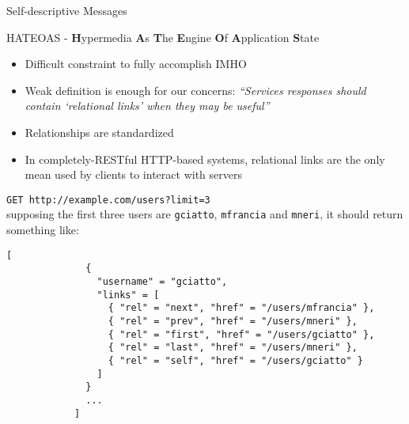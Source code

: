 \begin{frame}
\begin{block}{Self-descriptive Messages}
\begin{itemize}
		\end{itemize}
	\end{block}
	
	\framebreak
	
	\begin{block}{HATEOAS - \textbf{H}ypermedia \textbf{A}s \textbf{T}he \textbf{E}ngine \textbf{O}f \textbf{A}pplication \textbf{S}tate}
			
		\begin{itemize}
			\item Difficult constraint to fully accomplish IMHO
			\item Weak definition is enough for our concerns: \emph{``Services responses should contain \emph{`relational links'} when they may be useful''}
			\item Relationships are standardized
			\item In completely-RESTful HTTP-based systems, relational links are the only mean used by clients to interact with servers
		\end{itemize}
	\end{block}
	
	\begin{example}
		\texttt{GET http://example.com/users?limit=3} \\
		supposing the first three users are \texttt{gciatto}, \texttt{mfrancia} and \texttt{mneri}, it should return something like:
		\begin{lstlisting}[basicstyle=\scriptsize]
			[
			  {
			    "username" = "gciatto",
			    "links" = [
			      { "rel" = "next", "href" = "/users/mfrancia" },
			      { "rel" = "prev", "href" = "/users/mneri" },
			      { "rel" = "first", "href" = "/users/gciatto" },
			      { "rel" = "last", "href" = "/users/mneri" },
			      { "rel" = "self", "href" = "/users/gciatto" }
			    ]
			  }
			  ...
			]
		\end{lstlisting}
	\end{example}
		
\end{frame}

